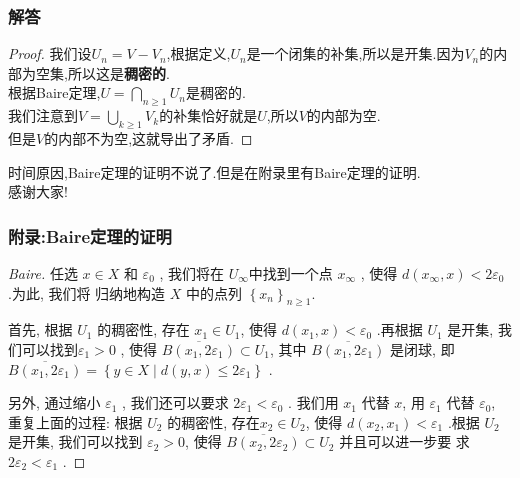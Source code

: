\documentclass[12pt,aspectratio=169,mathserif]{beamer}
\begin{document}
\begin{frame}
	\frametitle{解答}
	\begin{proof}
		我们设$U_n = V-V_n$,根据定义,$U_n$是一个闭集的补集,所以是开集.因为$V_n$的内部为空集,所以这是\textbf{稠密的}.\\ \pause
		根据Baire定理,$U=\bigcap_{n \geqslant 1} U_{n}$是稠密的.\\ \pause
		我们注意到$V=\bigcup_{k \geqslant 1} V_{k} $的补集恰好就是$U$,所以$V$的内部为空.\\ \pause
		但是$V$的内部不为空,这就导出了矛盾.
	\end{proof}
\end{frame}
\begin{frame}
	时间原因,Baire定理的证明不说了.但是在附录里有Baire定理的证明.\\
	感谢大家!
\end{frame}
\begin{frame}
	\frametitle{附录:Baire定理的证明}
	\begin{proof}[Baire]
		任选 $ x \in X $ 和 $ \varepsilon_{0}$ , 我们将在  $U_{\infty}  $中找到一个点  $x_{\infty}$ , 使得  $d\left(x_{\infty}, x\right)<2 \varepsilon_{0}$  .为此, 我们将 归纳地构造 $ X $ 中的点列  $\left\{x_{n}\right\}_{n \geqslant 1}  $.\pause
		
		首先, 根据  $U_{1} $ 的稠密性, 存在 $ x_{1} \in U_{1} $, 使得  $d\left(x_{1}, x\right)<\varepsilon_{0} $ .再根据 $ U_{1}$  是开集, 我们可以找到$  \varepsilon_{1}>0$ , 使得  $\overline{B\left(x_{1}, 2 \varepsilon_{1}\right)} \subset U_{1} $, 其中 $ \overline{B\left(x_{1}, 2 \varepsilon_{1}\right)} $ 是闭球, 即  $\overline{B\left(x_{1}, 2 \varepsilon_{1}\right)}=\left\{y \in X \mid d(y, x) \leqslant 2 \varepsilon_{1}\right\} $ .\pause
	
	 另外, 通过缩小 $ \varepsilon_{1}$ , 我们还可以要求 $ 2 \varepsilon_{1}<\varepsilon_{0}$  .
		我们用 $ x_{1}$  代替  $x $, 用 $ \varepsilon_{1}$  代替  $\varepsilon_{0} $, 重复上面的过程: 根据  $U_{2} $ 的稠密性, 存在$  x_{2} \in U_{2} $, 使得 $ d\left(x_{2}, x_{1}\right)<\varepsilon_{1} $ .根据 $ U_{2}$  是开集, 我们可以找到 $ \varepsilon_{2}>0 $, 使得 $ \overline{B\left(x_{2}, 2 \varepsilon_{2}\right)} \subset U_{2} $ 并且可以进一步要 求  $2 \varepsilon_{2}<\varepsilon_{1} $ .\pause
			\end{proof}
	\end{frame}
\end{document}
